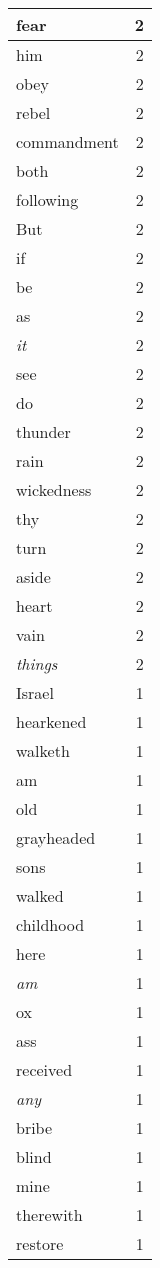 \begin{center}
\begin{longtable}{l|r}
fear & 2 \\ \hline
him & 2 \\ \hline
obey & 2 \\ \hline
rebel & 2 \\ \hline
commandment & 2 \\ \hline
both & 2 \\ \hline
following & 2 \\ \hline
But & 2 \\ \hline
if & 2 \\ \hline
be & 2 \\ \hline
as & 2 \\ \hline
\emph{it} & 2 \\ \hline
see & 2 \\ \hline
do & 2 \\ \hline
thunder & 2 \\ \hline
rain & 2 \\ \hline
wickedness & 2 \\ \hline
thy & 2 \\ \hline
turn & 2 \\ \hline
aside & 2 \\ \hline
heart & 2 \\ \hline
vain & 2 \\ \hline
\emph{things} & 2 \\ \hline
Israel & 1 \\ \hline
hearkened & 1 \\ \hline
walketh & 1 \\ \hline
am & 1 \\ \hline
old & 1 \\ \hline
grayheaded & 1 \\ \hline
sons & 1 \\ \hline
walked & 1 \\ \hline
childhood & 1 \\ \hline
here & 1 \\ \hline
\emph{am} & 1 \\ \hline
ox & 1 \\ \hline
ass & 1 \\ \hline
received & 1 \\ \hline
\emph{any} & 1 \\ \hline
bribe & 1 \\ \hline
blind & 1 \\ \hline
mine & 1 \\ \hline
therewith & 1 \\ \hline
restore & 1 \\ \hline

\end{longtable}
\end{center}
